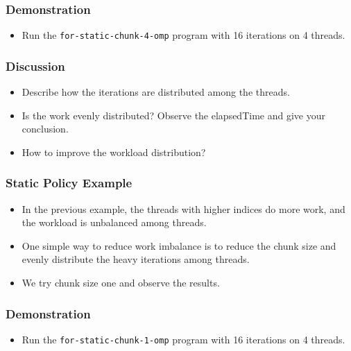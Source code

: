 \documentclass{beamer}
\begin{document}

\begin{frame}
  \frametitle{Demonstration}
  \begin{itemize}
  \item Run the {\tt for-static-chunk-4-omp} program with 16 iterations
    on 4 threads.
  \end{itemize}
\end{frame}

\begin{frame}
  \frametitle{Discussion}
  \begin{itemize}
  \item Describe how the iterations are distributed among the threads.
  \item Is the work evenly distributed? Observe the elapsedTime and give
    your conclusion.
  \item How to improve the workload distribution?
  \end{itemize}
\end{frame}




\begin{frame}
  \frametitle{Static Policy Example}
  \begin{itemize}
  \item In the previous example, the threads with higher indices do
    more work, and the workload is unbalanced among threads.
  \item One simple way to reduce work imbalance is to reduce the chunk size and evenly distribute the heavy iterations among threads.
  \item We try chunk size one and observe the results.
  \end{itemize}
\end{frame}

\begin{frame}
\end{frame}

\begin{frame}
  \frametitle{Demonstration}
  \begin{itemize}
  \item Run the {\tt for-static-chunk-1-omp} program with 16 iterations
    on 4 threads.
  \end{itemize}
\end{frame}
\end{document}

